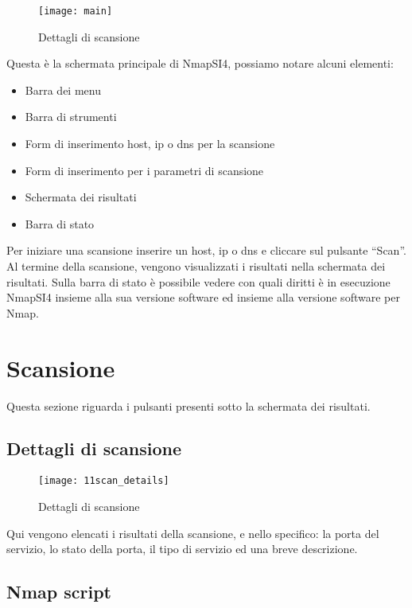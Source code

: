 \begin{figure}[h]
  \centering
  \texttt{[image: main]}
  \caption{Dettagli di scansione}
  \label{fig:ContentsMainScanDetails}
\end{figure}
Questa \`e la schermata principale di NmapSI4, possiamo notare alcuni elementi:
\begin{itemize}
\item Barra dei menu
\item Barra di strumenti
\item Form di inserimento host, ip o dns per la scansione
\item Form di inserimento per i parametri di scansione
\item Schermata dei risultati
\item Barra di stato
\end{itemize}
Per iniziare una scansione inserire un host, ip o dns e cliccare sul pulsante 
``Scan''. Al termine della scansione, vengono visualizzati i risultati nella 
schermata dei risultati. Sulla barra di stato \`e possibile vedere con quali 
diritti \`e in esecuzione NmapSI4 insieme alla sua versione software ed 
insieme alla versione software per Nmap.

\section{Scansione}
\label{sec:ContentsScan}

Questa sezione riguarda i pulsanti presenti sotto la schermata dei risultati.

\subsection{Dettagli di scansione}
\label{sec:ContentsScanDetails}

\begin{figure}[h]
  \centering
  \texttt{[image: 11scan\_details]}
  \caption{Dettagli di scansione}
  \label{fig:ScanDetails}
\end{figure}
Qui vengono elencati i risultati della scansione, e nello specifico: la porta 
del servizio, lo stato della porta, il tipo di servizio ed una breve descrizione.

\subsection{Nmap script}
\label{sec:NmapScript}

